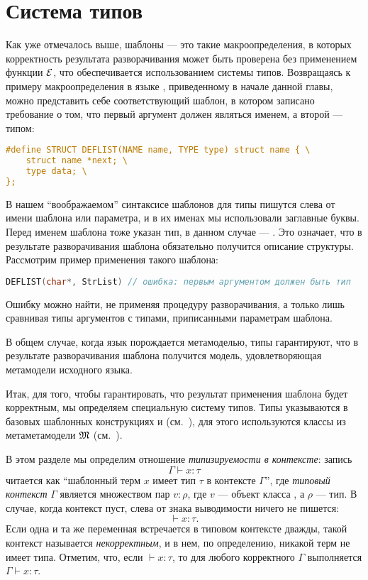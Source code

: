 \section{Система типов}

Как уже отмечалось выше, шаблоны --- это такие макроопределения, в которых корректность результата разворачивания может быть проверена без применением функции $\mathcal{E}$, что обеспечивается использованием системы типов. Возвращаясь к примеру макроопределения в языке , приведенному в начале данной главы, можно представить себе соответствующий шаблон, в котором записано требование о том, что первый аргумент должен являться именем, а второй --- типом:
\begin{lstlisting}[language=C]
#define STRUCT DEFLIST(NAME name, TYPE type) struct name { \
	struct name *next; \
	type data; \
};
\end{lstlisting}
В нашем ``воображаемом'' синтаксисе шаблонов для  типы пишутся слева от имени шаблона или параметра, и в их именах мы использовали заглавные буквы. Перед именем шаблона тоже указан тип, в данном случае --- . Это означает, что в результате разворачивания шаблона  обязательно получится описание структуры. Рассмотрим пример применения такого шаблона:
\begin{lstlisting}[language=C]
DEFLIST(char*, StrList) // ошибка: первым аргументом должен быть тип
\end{lstlisting}
Ошибку можно найти, не применяя процедуру разворачивания, а только лишь сравнивая типы аргументов с типами, приписанными параметрам шаблона.

В общем случае, когда язык порождается метамоделью, типы гарантируют, что в результате разворачивания шаблона получится модель, удовлетворяющая метамодели исходного языка.

Итак, для того, чтобы гарантировать, что результат применения шаблона будет корректным, мы определяем специальную систему типов. Типы указываются в базовых шаблонных конструкциях   и  (см.~), для этого используются классы из метаметамодели $\mathfrak{M}$ (см.~). 

В этом разделе мы определим отношение \emph{типизируемости в контексте}: запись 
$$\Gamma \vdash x : \tau$$
читается как ``шаблонный терм $x$ имеет тип $\tau$ в контексте $\Gamma$'', где \emph{типовый контекст} $\Gamma$ является множеством пар $v : \rho$, где $v$ --- объект класса , а $\rho$ --- тип. В случае, когда контекст пуст, слева от знака выводимости ничего не пишется: 
$$\vdash x : \tau.$$
Если одна и та же переменная встречается в типовом контексте дважды, такой контекст называется \emph{некорректным}, и в нем, по определению, никакой терм не имеет типа. Отметим, что, если $\vdash x : \tau$, то для любого корректного $\Gamma$ выполняется $\Gamma \vdash x : \tau$.

